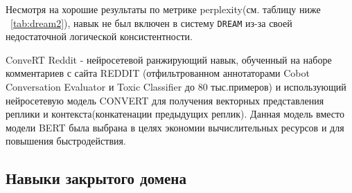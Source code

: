 Несмотря на хорошие результаты по метрике perplexity(см. таблицу ниже ~\ref{tab:dream2}), навык не был включен в систему \texttt{DREAM} из-за своей недостаточной логической консистентности.


\begin{table}[htbp]
\centering
\caption {Точность (перплексия) для генеративного навыка}
\label{tab:dream2}%
\end{table}



ConveRT Reddit - нейросетевой ранжирующий навык, обученный на наборе комментариев с сайта REDDIT \cite{na_website_ndu} (отфильтрованном аннотаторами Cobot Conversation Evaluator и Toxic Classifier до 80 тыс.примеров) и использующий нейросетевую модель CONVERT \cite{henderson_2019} для получения векторных представления реплики и контекста(конкатенации предыдущих реплик). Данная модель вместо модели BERT была выбрана в целях экономии вычислительных ресурсов и для повышения быстродействия.

\subsection{Навыки закрытого домена}\label{dream:1:closed}

